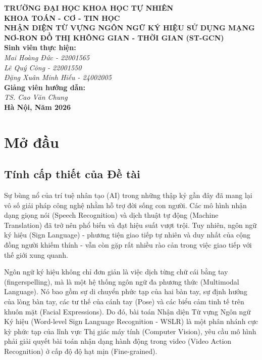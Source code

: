 \documentclass[a4paper,12pt]{report}
\begin{document}
\begin{titlepage}
    \centering
    \vspace*{2cm}
    \Large \textbf{TRƯỜNG ĐẠI HỌC KHOA HỌC TỰ NHIÊN}\\
    \Large \textbf{KHOA TOÁN - CƠ - TIN HỌC}\\
    \vspace{1cm}
    \LARGE \textbf{NHẬN DIỆN TỪ VỰNG NGÔN NGỮ KÝ HIỆU SỬ DỤNG MẠNG NƠ-RON ĐỒ THỊ KHÔNG GIAN - THỜI GIAN (ST-GCN)}\\
    \vspace{2cm}
    \Large \textbf{Sinh viên thực hiện:}\\
    \vspace{0.5cm}
    \textit{Mai Hoàng Đức - 22001565}\\
    \vspace{1cm}
    \textit{Lê Quý Công - 22001550}\\
    \vspace{1cm}
    \textit{Đặng Xuân Minh Hiếu - 24002005}\\
    \vspace{1cm}
    \Large \textbf{Giảng viên hướng dẫn:}\\
    \vspace{0.5cm}
    \textit{TS. Cao Văn Chung}\\
    \vfill
    \Large \textbf{Hà Nội, Năm 2026}
\end{titlepage}

\tableofcontents
\listoffigures
\listoftables
\newpage

\chapter{Mở đầu}

\section{Tính cấp thiết của Đề tài}
Sự bùng nổ của trí tuệ nhân tạo (AI) trong những thập kỷ gần đây đã mang lại vô số giải pháp công nghệ nhằm hỗ trợ đời sống con người. Các mô hình nhận dạng giọng nói (Speech Recognition) và dịch thuật tự động (Machine Translation) đã trở nên phổ biến và đạt hiệu suất vượt trội. Tuy nhiên, ngôn ngữ ký hiệu (Sign Language) - phương tiện giao tiếp tự nhiên và duy nhất của cộng đồng người khiếm thính - vẫn còn gặp rất nhiều rào cản trong việc giao tiếp với thế giới xung quanh. 

Ngôn ngữ ký hiệu không chỉ đơn giản là việc dịch từng chữ cái bằng tay (fingerspelling), mà là một hệ thống ngôn ngữ đa phương thức (Multimodal Language). Nó bao gồm sự di chuyển phức tạp của hai bàn tay, sự định hướng của lòng bàn tay, các tư thế của cánh tay (Pose) và các biểu cảm tinh tế trên khuôn mặt (Facial Expressions). Do đó, bài toán Nhận diện Từ vựng Ngôn ngữ Ký hiệu (Word-level Sign Language Recognition - WSLR) là một phân nhánh cực kỳ phức tạp của lĩnh vực Thị giác máy tính (Computer Vision), yêu cầu mô hình phải giải quyết bài toán nhận dạng hành động trong video (Video Action Recognition) ở cấp độ độ hạt mịn (Fine-grained).
\end{document}
